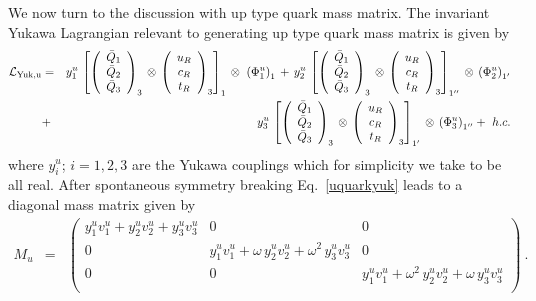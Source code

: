\documentclass[english,10pt,aps,prd,a4paper,preprintnumbers,floatfix,nofootinbib,showpacs,superscriptaddress]{revtex4-1}
\begin{document}
We now turn to the discussion with up type quark mass matrix.  The
invariant Yukawa Lagrangian relevant to generating up type quark mass
matrix is given by
   \begin{eqnarray}
  \mathcal{L}_{\rm{Yuk}, u}  & = & y^u_1 \, \left [  \left( \begin{array}{c} \bar{Q}_1  \\ \bar{Q}_2 \\ \bar{Q}_3 \end{array} \right)_{3} \, \otimes \,  \left( \begin{array}{c}  u_{R}   \\ c_{R} \\ t_{R} \end{array} \right)_{3}  \right]_1 \, \otimes \ \left ({\Phi}^u_1 \right)_1   
  \, + \,    y^u_2 \,  \left [  \left( \begin{array}{c} \bar{Q}_1  \\ \bar{Q}_2 \\ \bar{Q}_3 \end{array} \right)_{3} \, \otimes \,  \left( \begin{array}{c}  u_{R}   \\ c_{R} \\ t_{R} \end{array} \right)_{3}  \right]_{1''} \, \otimes \,  \left ({\Phi}^u_2 \right)_{1'} \nonumber \\
  & + & y_3^u \, \left [  \left( \begin{array}{c} \bar{Q}_1  \\ \bar{Q}_2 \\ \bar{Q}_3 \end{array} \right)_{3} \, \otimes \,  \left( \begin{array}{c}  u_{R}   \\ c_{R} \\ t_{R} \end{array} \right)_{3}  \right]_{1'} \, \otimes \,   \left ({\Phi}^u_3 \right)_{1''}   + \, \, h.c. 
  \label{uquarkyuk}
 \end{eqnarray}
 where $y^u_i$; $i = 1,2,3$ are the Yukawa couplings which for
 simplicity we take to be all real.  After spontaneous symmetry
 breaking Eq.~\ref{uquarkyuk} leads to a diagonal mass matrix given by
%
\begin{eqnarray}
 M_u & = & \left( 
\begin{array}{ccc}
y^u_1 v^u_1 + y^u_2 v^u_2  + y^u_3 v^u_3   & 0               &   0       \\
0            & y^u_1 v^u_1 + \omega \, y^u_2 v^u_2  + \omega^2 \, y^u_3 v^u_3         &   0     \\
0            & 0           &   y^u_1 v^u_1 + \omega^2 \, y^u_2 v^u_2  + \omega \, y^u_3 v^u_3           \\  
\end{array}
\right)~.
 \label{upmassmat}
\end{eqnarray}
\end{document}
